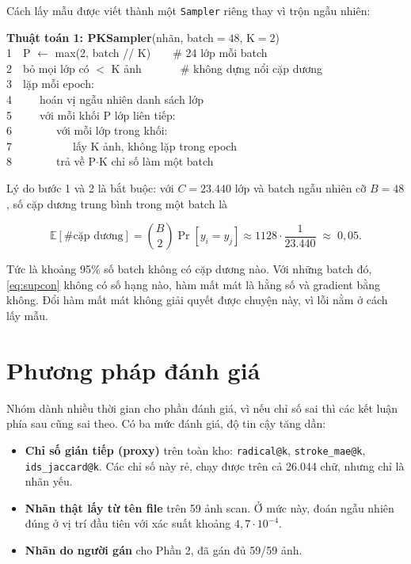 \documentclass[conference,a4paper]{IEEEtran}
\newcommand{\code}[1]{{\small\texttt{#1}}}
\begin{document}
\medskip
Cách lấy mẫu được viết thành một \code{Sampler} riêng thay vì trộn ngẫu nhiên:

{\footnotesize\ttfamily\raggedright
\textbf{Thuật toán 1: PKSampler}(nhãn, batch$=48$, K$=2$)\\
1\ \ P $\leftarrow$ max(2, batch // K)\ \ \ \ \# 24 lớp mỗi batch\\
2\ \ bỏ mọi lớp có $<$ K ảnh\ \ \ \ \ \ \ \# không dựng nổi cặp dương\\
3\ \ lặp mỗi epoch:\\
4\ \ \ \ \ hoán vị ngẫu nhiên danh sách lớp\\
5\ \ \ \ \ với mỗi khối P lớp liên tiếp:\\
6\ \ \ \ \ \ \ \ với mỗi lớp trong khối:\\
7\ \ \ \ \ \ \ \ \ \ \ lấy K ảnh, không lặp trong epoch\\
8\ \ \ \ \ \ \ \ trả về P$\cdot$K chỉ số làm một batch\\
}

\medskip
Lý do bước 1 và 2 là bắt buộc: với $C = 23.440$ lớp và batch ngẫu nhiên cỡ $B = 48$, số cặp dương
trung bình trong một batch là

\begin{equation}
\label{eq:pairs}
\mathbb{E}[\#\text{cặp dương}] = \binom{B}{2}\Pr[y_i{=}y_j] \approx 1128 \cdot \frac{1}{23.440}
\;\approx\; 0{,}05 .
\end{equation}

Tức là khoảng 95\% số batch không có cặp dương nào. Với những batch đó, \eqref{eq:supcon} không có
số hạng nào, hàm mất mát là hằng số và gradient bằng không. Đổi hàm mất mát không giải quyết được
chuyện này, vì lỗi nằm ở cách lấy mẫu.

\section{Phương pháp đánh giá}
\label{sec:eval}

Nhóm dành nhiều thời gian cho phần đánh giá, vì nếu chỉ số sai thì các kết luận phía sau cũng sai
theo. Có ba mức đánh giá, độ tin cậy tăng dần:

\begin{itemize}
  \item \textbf{Chỉ số gián tiếp (proxy)} trên toàn kho: \code{radical@k}, \code{stroke\_mae@k},
        \code{ids\_jaccard@k}. Các chỉ số này rẻ, chạy được trên cả 26.044 chữ, nhưng chỉ là nhãn yếu.
  \item \textbf{Nhãn thật lấy từ tên file} trên 59 ảnh scan. Ở mức này, đoán ngẫu nhiên đúng ở vị trí
        đầu tiên với xác suất khoảng $4{,}7\cdot10^{-4}$.
  \item \textbf{Nhãn do người gán} cho Phần 2, đã gán đủ 59/59 ảnh.
\end{itemize}
\end{document}
